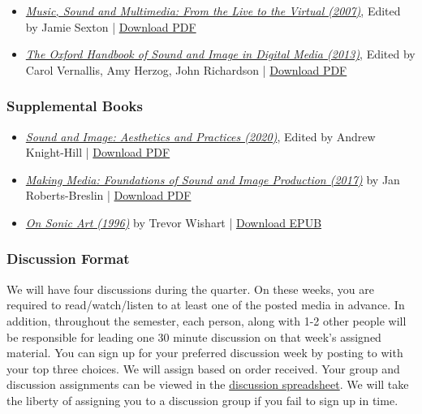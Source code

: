 \begin{itemize}
      \tightlist
      \item \emph{\href{https://books.google.com/books?id=j-iqBgAAQBAJ&newbks=1&newbks_redir=0&source=gbs_navlinks_s}{Music, Sound and Multimedia: From the Live to the Virtual (2007)}}, Edited by Jamie Sexton | \href{supplements/Music_Sound_and_Multimedia_-_From_the_Live_to_the_Virtual_(Music_and_the_Moving_Image)_(2008).pdf}{Download PDF} 
      \item \emph{\href{https://books.google.com/books/about/The_Oxford_Handbook_of_Sound_and_Image_i.html?id=XWHSAQAAQBAJ}{The Oxford Handbook of Sound and Image in Digital Media (2013)}}, Edited by Carol Vernallis, Amy Herzog, John Richardson | \href{supplements/The_Oxford_Handbook_of_Sound_and_Image_in_Digital_Media_(2013).pdf}{Download PDF} 
\end{itemize}

\subsubsection{Supplemental Books}

\begin{itemize}
      \tightlist
      \item \emph{\href{https://books.google.com/books/about/Sound_and_Image.html?id=-wpUzQEACAAJ}{Sound and Image: Aesthetics and Practices (2020)}}, Edited by Andrew Knight-Hill | \href{supplements/Sound_and_Image_-_Aesthetics_and_Practices_(Sound_Design)_(2020).pdf}{Download PDF} 
      \item \emph{\href{https://books.google.com/books?id=aGYPEAAAQBAJ&newbks=1&newbks_redir=0&source=gbs_navlinks_s}{Making Media: Foundations of Sound and Image Production (2017)}} by Jan Roberts-Breslin | \href{supplements/Making_Media_-_Foundations_of_Sound_and_Image_Production_(2003).pdf}{Download PDF} 
      \item \emph{\href{https://books.google.com/books?id=KbYyDQAAQBAJ&dq=On_Sonic_Art_(Contemporary_Music_Studies)_(2002)&source=gbs_navlinks_s}{On Sonic Art (1996)}} by Trevor Wishart | \href{supplements/On_Sonic_Art_(Contemporary_Music_Studies)_(2002).epub}{Download EPUB} 
\end{itemize}

\subsubsection{Discussion Format}

We will have four discussions during the quarter. On these weeks, you are required to read/watch/listen to at least one of the posted media in advance. In addition, throughout the semester, each person, along with 1-2 other people will be responsible for leading one 30 minute discussion on that week's assigned material. You can sign up for your preferred discussion week by posting to  with your top three choices. We will assign based on order received. Your group and discussion assignments can be viewed in the \href{https://docs.google.com/spreadsheets/d/1Fw-DHUMtnCnlHasDcXCUGjx8n23QxS_RaPrshLq49R0/edit?usp=sharing}{discussion spreadsheet}. We will take the liberty of assigning you to a discussion group if you fail to sign up in time.

